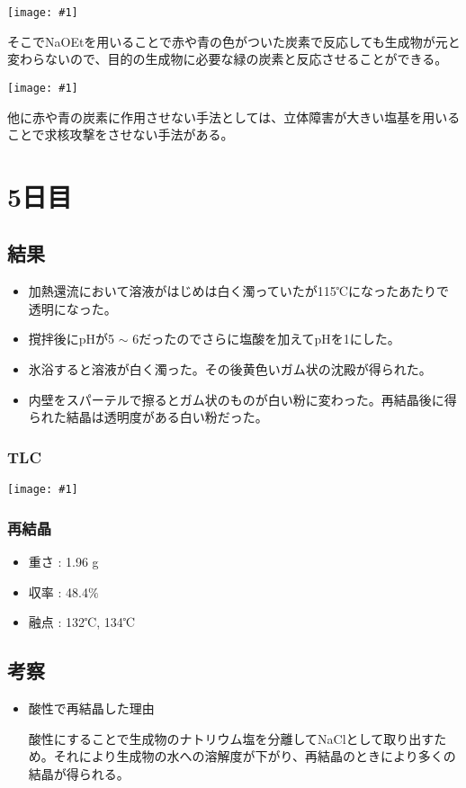 \documentclass[a4paper,papersize,dvipdfmx]{jsarticle}
\newcommand{\pict}[2]{\begin{center} \texttt{[image: \#1]} \end{center}}   %
\begin{document}
\pict{imgs4/st1.jpeg}{10}

そこでNaOEtを用いることで赤や青の色がついた炭素で反応しても生成物が元と変わらないので、目的の生成物に必要な緑の炭素と反応させることができる。

\pict{imgs4/st2.jpeg}{10}

他に赤や青の炭素に作用させない手法としては、立体障害が大きい塩基を用いることで求核攻撃をさせない手法がある。


\section*{5日目}
\subsection*{結果}
\begin{itemize}
\item 加熱還流において溶液がはじめは白く濁っていたが115℃になったあたりで透明になった。
\item 撹拌後にpHが5 $\sim$ 6だったのでさらに塩酸を加えてpHを1にした。
\item 氷浴すると溶液が白く濁った。その後黄色いガム状の沈殿が得られた。
\item 内壁をスパーテルで擦るとガム状のものが白い粉に変わった。再結晶後に得られた結晶は透明度がある白い粉だった。

\end{itemize}
\subsubsection*{TLC}

\pict{imgs5/tlc.jpeg}{8}

\subsubsection*{再結晶}
\begin{itemize}
\item 重さ : 1.96 g
\item 収率 : 48.4$\%$
\item 融点 : 132℃, 134℃
\end{itemize}


\subsection*{考察}
\begin{itemize}
\item 酸性で再結晶した理由

酸性にすることで生成物のナトリウム塩を分離してNaClとして取り出すため。それにより生成物の水への溶解度が下がり、再結晶のときにより多くの結晶が得られる。
\end{itemize}
\end{document}
